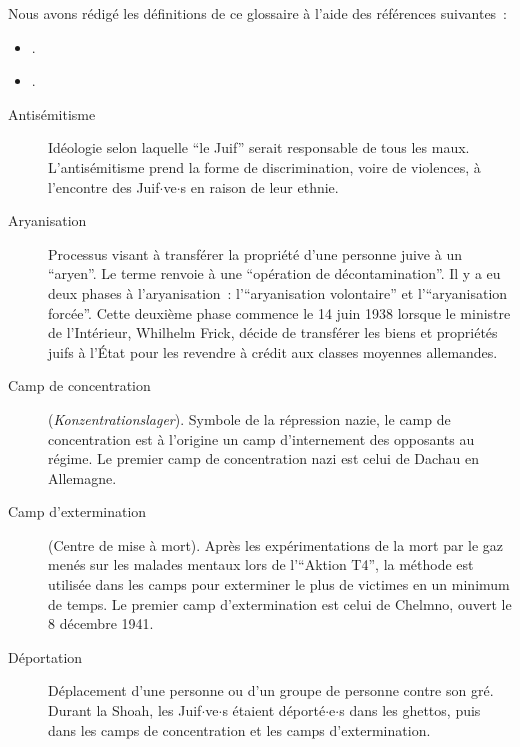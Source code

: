 
\label{Glossaire}

Nous avons rédigé les définitions de ce glossaire à l'aide des références suivantes~:
\begin{itemize}
    \item \cite{Bensoussan2020}.
    \item \cite{Bruttmann2020}.
\end{itemize}

\bigskip
\bigskip

\begin{description}
    
    \item[Antisémitisme] Idéologie selon laquelle \enquote{le Juif} serait responsable de tous les maux. L'antisémitisme prend la forme de discrimination, voire de violences, à l'encontre des Juif$\cdot$ve$\cdot$s en raison de leur ethnie. 
    
    \item[Aryanisation] Processus visant à transférer la propriété d'une personne juive à un \enquote{aryen}. Le terme renvoie à une \enquote{opération de décontamination}. Il y a eu deux phases à l'aryanisation~: l'\enquote{aryanisation volontaire} et l'\enquote{aryanisation forcée}. Cette deuxième phase commence le 14 juin 1938 lorsque le ministre de l'Intérieur, Whilhelm Frick, décide de transférer les biens et propriétés juifs à l'État pour les revendre à crédit aux classes moyennes allemandes.      
    
    \item[Camp de concentration] (\textit{Konzentrationslager}). Symbole de la répression nazie, le camp de concentration est à l'origine un camp d'internement des opposants au régime. Le premier camp de concentration nazi est celui de Dachau en Allemagne.
    
    \item[Camp d'extermination] (Centre de mise à mort). Après les expérimentations de la mort par le gaz menés sur les malades mentaux lors de l'\enquote{Aktion T4}, la méthode est utilisée dans les camps pour exterminer le plus de victimes en un minimum de temps. Le premier camp d'extermination est celui de Chelmno, ouvert le 8 décembre 1941.
    
    \item[Déportation] Déplacement d'une personne ou d'un groupe de personne contre son gré. Durant la Shoah, les Juif$\cdot$ve$\cdot$s étaient déporté$\cdot$e$\cdot$s dans les ghettos, puis dans les camps de concentration et les camps d'extermination.
    

\end{description}
